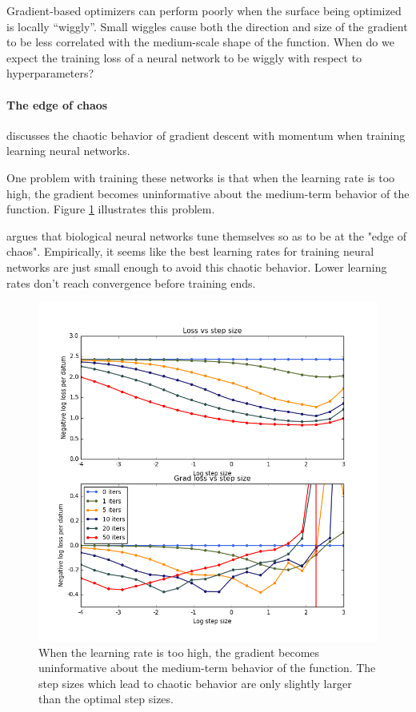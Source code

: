 \documentclass{article}
\begin{document}
Gradient-based optimizers can perform poorly when the surface being optimized is locally ``wiggly''.
Small wiggles cause both the direction and size of the gradient to be less correlated with the medium-scale shape of the function.
When do we expect the training loss of a neural network to be wiggly with respect to hyperparameters?

\paragraph{The edge of chaos}
\citet*[Chapter 4]{pearlmutter1996investigation} discusses the chaotic behavior of gradient descent with momentum when training learning neural networks.

One problem with training these networks is that when the learning rate is too high, the gradient becomes uninformative about the medium-term behavior of the function.
Figure \ref{fig:chaos} illustrates this problem.

\cite{pearlmutter2009sleep} argues that biological neural networks tune themselves so as to be at the "edge of chaos".
Empirically, it seems like the best learning rates for training neural networks are just small enough to avoid this chaotic behavior.
Lower learning rates don't reach convergence before training ends.


\begin{figure}[ht]
\vskip 0.2in
\begin{center}
\centerline{\includegraphics[width=\columnwidth]{../experiments/Jan_14_learning_rate_wiggliness/1/fig.png}}
\caption{When the learning rate is too high, the gradient becomes uninformative about the medium-term behavior of the function.
The step sizes which lead to chaotic behavior are only slightly larger than the optimal step sizes.}
\label{fig:chaos}
\end{center}
\vskip -0.2in
\end{figure} 
\end{document}
